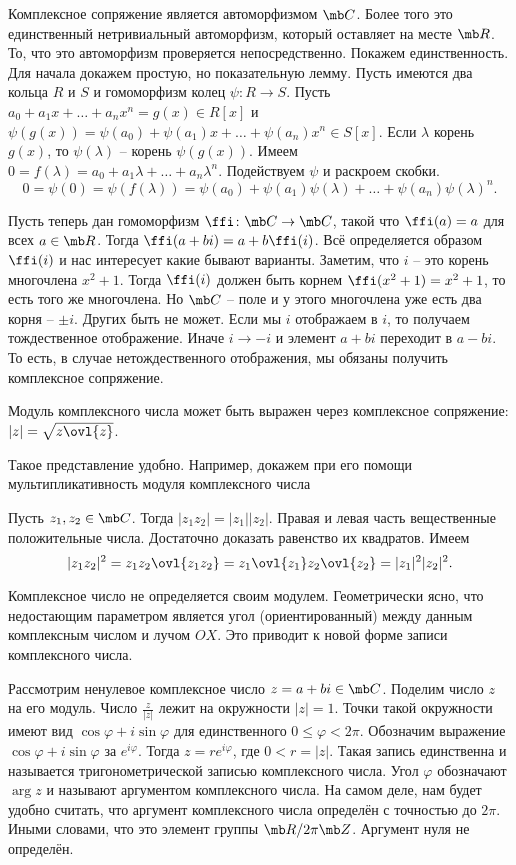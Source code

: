 \utv Комплексное сопряжение является автоморфизмом $\mb C$. Более того это единственный нетривиальный автоморфизм, который оставляет на месте $\mb R$.
\eutv
\proof То, что это автоморфизм проверяется непосредственно. Покажем единственность. Для начала докажем простую, но показательную лемму.
  Пусть имеются два кольца $R$ и $S$ и гомоморфизм колец $\psi\colon R \to S$. Пусть $a_0+a_1x+\dots+a_nx^n=g(x)\in R[x]$ и $\psi(g(x))=\psi(a_0)+\psi(a_1)x+\dots+\psi(a_n)x^n \in S[x]$.  Если $\lambda$ корень $g(x)$, то $\psi(\lambda)$ -- корень $\psi(g(x))$. 
\elm
\proof Имеем $0=f(\lambda)=a_0+a_1\lambda+\dots+a_n\lambda^n$. Подействуем $\psi$ и раскроем скобки. 
$$0=\psi(0)=\psi(f(\lambda))=\psi(a_0)+\psi(a_1)\psi(\lambda)+\dots+\psi(a_n)\psi(\lambda)^n.$$
\endproof

Пусть теперь дан гомоморфизм $\ffi\colon \mb C \to \mb C$, такой что $\ffi(a)=a$ для всех $a\in \mb R$. Тогда $\ffi(a+bi)=a+b\ffi(i)$. Всё определяется образом $\ffi(i)$ и нас интересует какие бывают варианты. Заметим, что $i$ -- это корень многочлена $x^2+1$. Тогда $\ffi(i)$ должен быть корнем $\ffi(x^2+1)=x^2+1$, то есть того же многочлена.  Но $\mb C$ -- поле и у этого многочлена уже есть два корня -- $\pm i$. Других быть не может. Если мы $i$ отображаем в $i$, то получаем тождественное отображение. Иначе $i\to -i$ и элемент $a+bi$ переходит в $a-bi$. То есть, в случае нетождественного отображения, мы обязаны получить комплексное сопряжение.
\endproof


\rm Модуль комплексного числа может быть выражен через комплексное сопряжение: $|z|=\sqrt{z\ovl{z}}$.
\erm

Такое представление удобно. Например, докажем при его помощи мультипликативность модуля комплексного числа

\utv Пусть $z_1, z_2\in \mb C$. Тогда $|z_1z_2| = |z_1||z_2|$.
\eutv
\proof Правая и левая часть вещественные положительные числа. Достаточно доказать равенство их квадратов. Имеем
$$|z_1z_2|^2=z_1z_2\ovl{z_1z_2}= z_1\ovl{z_1}z_2\ovl{z_2}=|z_1|^2|z_2|^2.$$
\endproof


Комплексное число не определяется своим модулем. Геометрически ясно, что недостающим параметром является угол (ориентированный) между данным комплексным числом и лучом $OX$. Это приводит к новой форме записи комплексного числа.

 Рассмотрим ненулевое комплексное число $z= a+bi\in\mb C$. Поделим число $z$ на его модуль. Число
$\frac{z}{|z|}$ лежит на окружности $|z| = 1$. Точки такой окружности имеют вид $\cos\varphi +i\sin\varphi$ для единственного $0 \leq \varphi < 2\pi$. Обозначим выражение $\cos\varphi+i\sin\varphi$ за $e^{i\varphi}$. Тогда $z=re^{i\varphi}$, где $0<r=|z|$.
Такая запись единственна и называется тригонометрической записью комплексного числа. Угол $\varphi$ обозначают $\arg z$ и называют аргументом комплексного числа. На самом деле, нам будет удобно считать, что аргумент комплексного числа определён с точностью до $2\pi$. Иными словами, что это элемент группы $\mb R/2\pi\mb Z$. Аргумент нуля не определён.
\edfn


